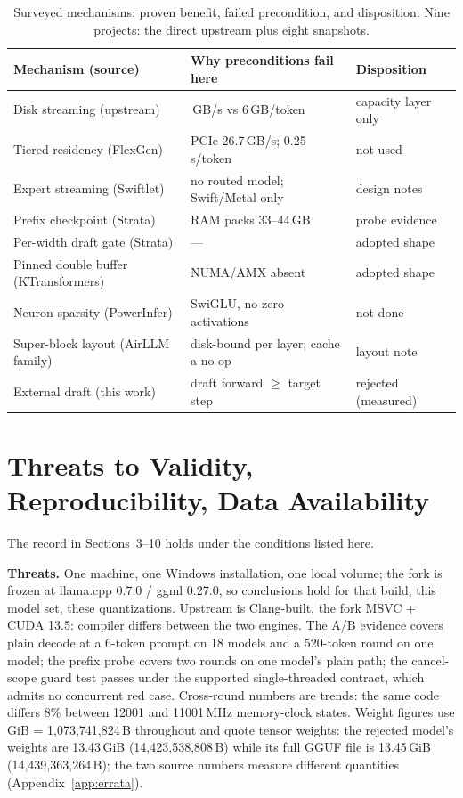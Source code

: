 \documentclass[letterpaper,twocolumn,10pt]{article}
\begin{document}
\begin{table}[t]
\centering
\small
\setlength{\tabcolsep}{2.6pt}
\begin{tabular}{@{}>{\raggedright\arraybackslash}p{}>{\raggedright\arraybackslash}p{}>{\raggedright\arraybackslash}p{}@{}}
\toprule
Mechanism (source) & Why preconditions fail here & Disposition \\
\midrule
Disk streaming (upstream) & 5.56\,GB/s vs 6\,GB/token & capacity layer only \\
Tiered residency (FlexGen) & PCIe 26.7\,GB/s; 0.25\,s/token & not used \\
Expert streaming (Swiftlet) & no routed model; Swift/Metal only & design notes \\
Prefix checkpoint (Strata) & RAM packs 33--44\,GB & probe evidence \\
Per-width draft gate (Strata) & --- & adopted shape \\
Pinned double buffer (KTransformers) & NUMA/AMX absent & adopted shape \\
Neuron sparsity (PowerInfer) & SwiGLU, no zero activations & not done \\
Super-block layout (AirLLM family) & disk-bound per layer; cache a no-op & layout note \\
External draft (this work) & draft forward $\ge$ target step & rejected (measured) \\
\bottomrule
\end{tabular}
\caption{Surveyed mechanisms: proven benefit, failed precondition, and
disposition. Nine projects: the direct upstream plus eight snapshots.}
\label{tab:oss}
\end{table}

\section{Threats to Validity, Reproducibility, Data Availability}

The record in Sections~3--10 holds under the conditions listed here.

\textbf{Threats.} One machine, one Windows installation, one local volume; the
fork is frozen at llama.cpp 0.7.0 / ggml 0.27.0, so conclusions hold for that
build, this model set, these quantizations. Upstream is Clang-built, the fork
MSVC + CUDA 13.5: compiler differs between the two engines. The A/B evidence
covers plain decode at a 6-token prompt on 18 models and a 520-token round on
one model;
the prefix probe covers two rounds on
one model's plain path; the cancel-scope guard test passes under the supported
single-threaded contract, which admits no concurrent red case. Cross-round
numbers are trends: the same code differs 8\% between 12001 and 11001\,MHz
memory-clock states. Weight figures use GiB = 1{,}073{,}741{,}824\,B
throughout and quote tensor weights: the rejected model's weights are
13.43\,GiB (14{,}423{,}538{,}808\,B) while its full GGUF file is 13.45\,GiB
(14{,}439{,}363{,}264\,B); the two source numbers measure different quantities
(Appendix~\ref{app:errata}).
\end{document}
